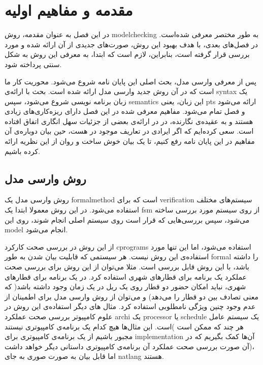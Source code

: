 \pagestyle{plain}
\setcounter{page}{1}

\chapter{مقدمه و مفاهیم اولیه}

در این فصل به عنوان مقدمه، روش \gls*{modelchecking} به‌ طور مختصر معرفی شده‌است. در فصل‌های بعدی، با هدف بهبود این روش، صورت‌های جدیدی از آن ارائه شده و مورد بررسی قرار گرفته است، بنابراین، لازم است که ابتدا، به معرفی این روش به شکل سنتی پرداخته شود.

پس از معرفی وارسی مدل، بحث اصلی این پایان نامه شروع می‌شود. محوریت کار ما\cite{calcul} است که در آن روش جدید وارسی مدل ارائه شده است. بحث با ارائه‌ی \gls*{syntax} یک زبان برنامه نویسی شروع می‌شود، سپس \gls*{semantics} این زبان، یعنی \gls{pts} ارائه می‌شود و فصل تمام می‌شود. مفاهیم معرفی شده در این فصل دارای ریزه‌کاری‌های زیادی هستند و به عقیده‌ی نگارنده، در \cite{calcul} در ارائه‌ی بعضی از جزئیات سهل انگاری اتفاق افتاده است. سعی کرده‌ایم که اگر ایرادی در تعاریف موجود در \cite{calcul} هست، حین بیان دوباره‌ی آن مفاهیم در این پایان نامه رفع کنیم، تا یک بیان خوش ساخت و روان از این نظریه ارائه کرده باشیم.


\section{روش وارسی مدل}

روش وارسی مدل یک \gls*{formalmethod} است که برای \gls*{verification} سیستم‌های مختلف استفاده می‌شود. در این روش معمولا ابتدا یک \gls*{fsm} از روی سیستم مورد بررسی ساخته می‌شود، سپس بررسی‌هایی که قرار است روی سیستم اصلی انجام شوند، روی این \gls*{model} انجام می‌شود. 

از این روش در بررسی صحت کارکرد \glspl*{cprogram} استفاده می‌شود، اما این تنها مورد استفاده‌ی این روش نیست. هر سیستمی که قابلیت بیان شدن به طور \gls*{formal} را داشته باشد، با این روش قابل بررسی است. مثلا می‌توان از این روش برای بررسی صحت عملکرد یک برنامه برای قطارهای شهری استفاده کرد. در یک برنامه‌ برای قطارهای شهری، نباید امکان حضور دو قطار روی یک ریل در یک زمان وجود داشته باشد( که معنی تصادف بین دو قطار را می‌دهد) و می‌توان از روش وارسی مدل برای اطمینان از عدم وجود چنین ویژگی نامطلوبی استفاده کرد. مثال های دیگر استفاده‌ی این روش در علوم کامپیوتر بررسی صحت عملکرد \gls*{archi} یک \gls*{processor} یا \gls*{schedule} یک سیستم عامل است. این مثال‌ها هیچ کدام یک برنامه‌ی کامپیوتری نیستند( هر چند که ممکن است مجبور باشیم از یک برنامه‌ی کامپیوتری برای \gls*{implementation} آن‌ها کمک بگیریم که در آن صورت بررسی صحت عملکرد آن برنامه‌ی کامپیوتری داستانی دیگر خواهد داشت)، اما قابل بیان به صورت صوری به جای \gls*{natlang} هستند.

